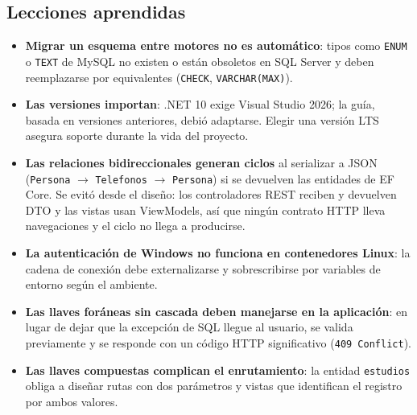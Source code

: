 \documentclass[12pt,letterpaper]{article}
\begin{document}
\subsection{Lecciones aprendidas}
\begin{itemize}[itemsep=4pt]
  \item \textbf{Migrar un esquema entre motores no es automático}: tipos como
        \texttt{ENUM} o \texttt{TEXT} de MySQL no existen o están obsoletos en SQL Server y
        deben reemplazarse por equivalentes (\texttt{CHECK}, \texttt{VARCHAR(MAX)}).
  \item \textbf{Las versiones importan}: .NET 10 exige Visual Studio 2026; la guía, basada
        en versiones anteriores, debió adaptarse. Elegir una versión LTS asegura soporte
        durante la vida del proyecto.
  \item \textbf{Las relaciones bidireccionales generan ciclos} al serializar a JSON
        (\texttt{Persona} $\rightarrow$ \texttt{Telefonos} $\rightarrow$ \texttt{Persona})
        si se devuelven las entidades de EF Core. Se evitó desde el diseño: los
        controladores REST reciben y devuelven DTO y las vistas usan ViewModels, así que
        ningún contrato HTTP lleva navegaciones y el ciclo no llega a producirse.
  \item \textbf{La autenticación de Windows no funciona en contenedores Linux}: la cadena
        de conexión debe externalizarse y sobrescribirse por variables de entorno según el
        ambiente.
  \item \textbf{Las llaves foráneas sin cascada deben manejarse en la aplicación}: en
        lugar de dejar que la excepción de SQL llegue al usuario, se valida previamente y
        se responde con un código HTTP significativo (\texttt{409 Conflict}).
  \item \textbf{Las llaves compuestas complican el enrutamiento}: la entidad
        \texttt{estudios} obliga a diseñar rutas con dos parámetros y vistas que
        identifican el registro por ambos valores.
\end{itemize}
\end{document}
